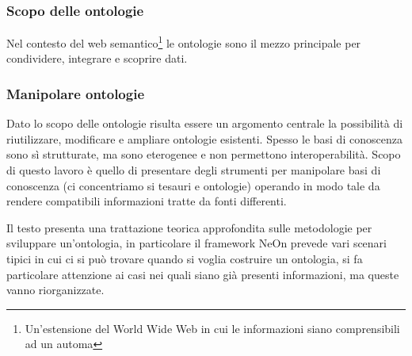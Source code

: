 \subsubsection{Scopo delle ontologie}
Nel contesto del web semantico\footnote{Un'estensione del World Wide Web in cui le informazioni siano comprensibili ad un automa\cite{berners2001new}} le ontologie sono il mezzo principale per condividere, integrare e scoprire dati\cite{hitzler2021review}.
\subsubsection{Manipolare ontologie}
 Dato lo scopo delle ontologie risulta essere un argomento centrale la possibilità di riutilizzare, modificare e ampliare ontologie esistenti. Spesso le basi di conoscenza sono sì strutturate, ma sono eterogenee e non permettono interoperabilità. Scopo di questo lavoro è quello di presentare degli strumenti per manipolare basi di conoscenza (ci concentriamo si tesauri e ontologie) operando in modo tale da rendere compatibili informazioni tratte da fonti differenti. 
 
 Il testo \cite{suarez2015neon} presenta una trattazione teorica approfondita sulle metodologie per sviluppare un'ontologia, in particolare il framework NeOn prevede vari scenari tipici in cui ci si può trovare quando si voglia costruire un ontologia, si fa particolare attenzione ai casi nei quali siano già presenti informazioni, ma queste vanno riorganizzate.
